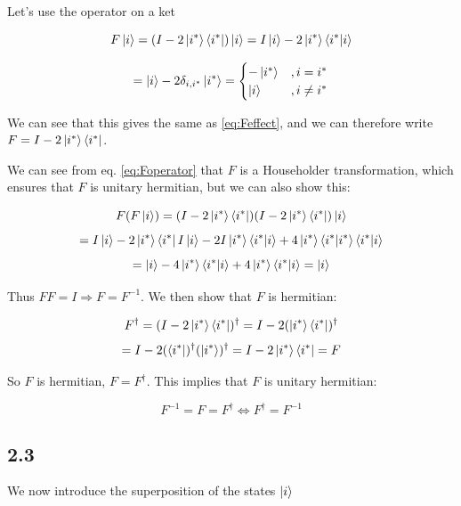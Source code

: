 \documentclass[a4paper,norsk, 10pt]{article}
\begin{document}
Let's use the operator on a ket

\begin{equation}
F\ket{i} = (I - 2\ket{i^*}\bra{i^*})\ket{i} = I\ket{i} - 2\ket{i^*}\bra{i^*}\ket{i}
\end{equation}

\begin{equation}
= \ket{i} - 2\delta_{i,i^*}\ket{i^*} =
\begin{cases}
-\ket{i^*} & , i = i^* \\
\ket{i} & , i \neq i^*
\end{cases}
\end{equation}

We can see that this gives the same as \eqref{eq:Feffect}, and we can therefore write $F = I - 2\ket{i^*}\bra{i^*}$.

We can see from eq. \ref{eq:Foperator} that $F$ is a Householder transformation, which ensures that $F$ is unitary hermitian, but we can also show this:

\begin{equation}
F(F\ket{i}) = (I - 2\ket{i^*}\bra{i^*})(I - 2\ket{i^*}\bra{i^*})\ket{i}
\end{equation}
\begin{equation}
= I\ket{i} - 2\ket{i^*}\bra{i^*}I\ket{i} -2I\ket{i^*}\bra{i^*}\ket{i} + 4\ket{i^*}\bra{i^*}\ket{i^*}\bra{i^*}\ket{i}
\end{equation}
\begin{equation}
= \ket{i} - 4\ket{i^*}\bra{i^*}\ket{i} + 4\ket{i^*}\bra{i^*}\ket{i} = \ket{i}
\end{equation}

Thus $FF = I \Rightarrow F = F^{-1}$. We then show that $F$ is hermitian:

\begin{equation}
F^\dagger = (I - 2\ket{i^*}\bra{i^*})^\dagger = I - 2(\ket{i^*}\bra{i^*})^\dagger
\end{equation}
\begin{equation}
= I - 2(\bra{i^*})^\dagger(\ket{i^*})^\dagger = I - 2\ket{i^*}\bra{i^*} = F
\end{equation}

So $F$ is hermitian, $F = F^\dagger$. This implies that $F$ is unitary hermitian:

\begin{equation}
F^{-1} = F = F^\dagger \Leftrightarrow F^\dagger = F^{-1}
\end{equation}


\subsection{2.3}
We now introduce the superposition of the states $\ket{i}$
\end{document}
